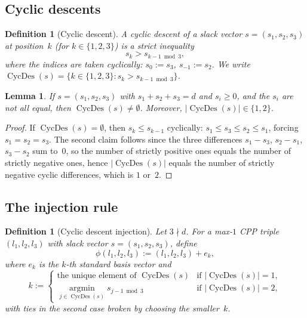 \documentclass[11pt]{article}
\newtheorem{lemma}[theorem]{Lemma}
\newtheorem{definition}[theorem]{Definition}
\begin{document}
\subsection{Cyclic descents}

\begin{definition}[Cyclic descent]
A \emph{cyclic descent} of a slack vector $s = (s_1, s_2, s_3)$ at position~$k$
(for $k \in \{1, 2, 3\}$) is a strict inequality
\[
  s_k > s_{k-1 \bmod 3},
\]
where the indices are taken cyclically: $s_0 := s_3$, $s_{-1} := s_2$.
We write $\operatorname{CycDes}(s) = \{k \in \{1,2,3\} : s_k > s_{k-1 \bmod 3}\}$.
\end{definition}

\begin{lemma}
\label{lem:cycdes-nonempty}
If $s = (s_1, s_2, s_3)$ with $s_1 + s_2 + s_3 = d$ and $s_i \geq 0$,
and the $s_i$ are not all equal, then $\operatorname{CycDes}(s) \neq \emptyset$.
Moreover, $|\operatorname{CycDes}(s)| \in \{1, 2\}$.
\end{lemma}

\begin{proof}
If $\operatorname{CycDes}(s) = \emptyset$, then $s_k \leq s_{k-1}$ cyclically:
$s_1 \leq s_3 \leq s_2 \leq s_1$, forcing $s_1 = s_2 = s_3$.
The second claim follows since the three differences
$s_1 - s_3$, $s_2 - s_1$, $s_3 - s_2$ sum to~$0$, so the number of
strictly positive ones equals the number of strictly negative ones,
hence $|\operatorname{CycDes}(s)|$ equals the number of strictly negative
cyclic differences, which is $1$ or~$2$.
\end{proof}

\subsection{The injection rule}

\begin{definition}[Cyclic descent injection]
\label{def:injection}
Let $3 \nmid d$. For a max-$1$ CPP triple $(l_1, l_2, l_3)$ with slack vector
$s = (s_1, s_2, s_3)$, define
\begin{equation}
  \phi(l_1, l_2, l_3) := (l_1, l_2, l_3) + e_k,
  \label{eq:phi-def}
\end{equation}
where $e_k$ is the $k$-th standard basis vector and
\[
  k := \begin{cases}
    \text{the unique element of } \operatorname{CycDes}(s)
      & \text{if } |\operatorname{CycDes}(s)| = 1, \\[4pt]
    \operatorname*{argmin}_{j \in \operatorname{CycDes}(s)} s_{j-1 \bmod 3}
      & \text{if } |\operatorname{CycDes}(s)| = 2,
  \end{cases}
\]
with ties in the second case broken by choosing the smaller~$k$.
\end{definition}
\end{document}
